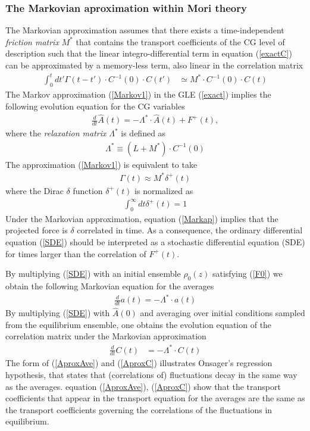 \documentclass[b5paper,openright,10pt]{book}
\newcommand{\esc}{\!\cdot\!}
\begin{document}
\subsubsection{The Markovian aproximation within Mori theory}
\label{Sec:Markov}
The   Markovian   approximation   assumes    that   there   exists   a
time-independent \textit{friction matrix} $M^*$ that
  contains the transport  coefficients of the CG  level of description
such that  the linear integro-differential term  in equation (\ref{exactC})
can  be  approximated  by  a  memory-less term,  also  linear  in  the
correlation matrix
\begin{align}
\int_0^tdt' \Gamma(t-t')\esc C^{-1}(0)\esc  C(t')&\simeq M^*\esc C^{-1}(0)\esc C(t)
\label{Markov1}
\end{align}
The  Markov approximation  (\ref{Markov1})  in  the GLE  (\ref{exact})
implies the following evolution equation for the CG variables
\begin{align}
  \frac{d}{dt}\hat{A}(t) = -\Lambda^*\esc \hat{A} (t) +F^+(t),
\label{SDE}
\end{align}
where the \textit{relaxation matrix} $\Lambda^*$ is defined as
\begin{align}
\Lambda^*\equiv(L+M^*)\esc C^{-1}(0)  
\label{Lambda}
\end{align}
The   approximation
(\ref{Markov1}) is equivalent to take
\begin{align}
  \Gamma(t) \approx M^*\delta^+(t)
\label{Markap}
\end{align}
where   the Dirac $\delta$ function
$\delta^+(t)$ is normalized as
\begin{align}
  \int_0^\infty dt \delta^+(t) =1
\end{align}
Under the  Markovian approximation,  equation  (\ref{Markap})  implies that
the projected  force is $\delta$ correlated  in time. As a  consequence, the
ordinary differential equation (\ref{SDE}) should be interpreted as a
stochastic  differential  equation (SDE)  for  times  larger than  the
correlation of $F^+(t)$.

By multiplying (\ref{SDE}) with an initial ensemble $\rho_0(z)$
satisfying (\ref{F0})
we obtain the following Markovian equation for the averages
\begin{align}
  \frac{d}{dt}a(t) = -\Lambda^*\esc a(t)
\label{AproxAve}
\end{align}
By  multiplying  (\ref{SDE})  with $\hat{A}(0)$  and  averaging  over
initial conditions sampled from  the equilibrium ensemble, one obtains
the evolution  equation of the  correlation matrix  under the
Markovian   approximation
\begin{align}
    \frac{d}{dt}C(t)&=-\Lambda^*\esc  C(t)
\label{AproxC}
\end{align}
The form of (\ref{AproxAve})  and (\ref{AproxC}) illustrates Onsager's
regression hypothesis, that states that (correlations of) fluctuations
decay  in  the  same  way  as  the  averages.   equation  (\ref{AproxAve}),
(\ref{AproxC}) show that the transport coefficients that appear in the
transport  equation for  the averages  are the  same as  the transport
coefficients  governing  the  correlations   of  the  fluctuations  in
equilibrium.
\end{document}
